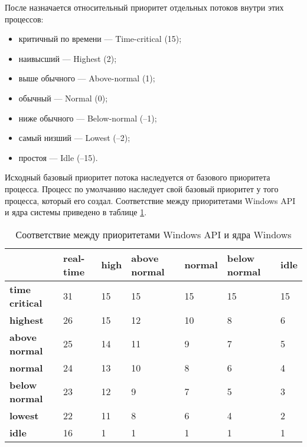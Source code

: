 \documentclass[a4paper,14pt,russian]{extreport}
\begin{document}
	После назначается относительный приоритет отдельных потоков внутри этих процессов:
	\begin{itemize}
		\item критичный по времени — Time-critical (15);
		\item наивысший — Highest (2);
		\item выше обычного — Above-normal (1);
		\item обычный — Normal (0);
		\item ниже обычного — Below-normal (–1);
		\item самый низший — Lowest (–2);
		\item простоя — Idle (–15).
	\end{itemize}

	Исходный базовый приоритет потока наследуется от базового приоритета процесса.
	Процесс по умолчанию наследует свой базовый приоритет у того процесса, который его создал.
	Соответствие между приоритетами Windows API и ядра системы приведено в таблице \ref{tbl:priority}.
	
	\begin{table}[h]
		\caption{Соответствие между приоритетами Windows API и ядра Windows}
		\begin{center}
			\begin{tabular}{|l|p{45pt}|p{45pt}|p{45pt}|p{45pt}|p{45pt}|p{45pt}|}
				\hline
				{} & \textbf{real-time} & \textbf{high} & \textbf{above normal} & \textbf{normal} & \textbf{below normal} & \textbf{idle}\\
				\hline
				\textbf{time critical} & 31 & 15 & 15 & 15 & 15 & 15 \\
				\hline
				\textbf{highest} & 26 & 15 & 12 & 10 & 8 & 6 \\
				\hline
				\textbf{above normal} & 25 & 14 & 11 & 9 & 7 & 5 \\
				\hline
				\textbf{normal} & 24 & 13 & 10 & 8 & 6 & 4 \\
				\hline
				\textbf{below normal} & 23 & 12 & 9 & 7 & 5 & 3 \\
				\hline
				\textbf{lowest} & 22 & 11 & 8 & 6 & 4 & 2 \\
				\hline
				\textbf{idle} & 16 & 1 & 1 & 1 & 1 & 1 \\
				\hline
			\end{tabular}
		\end{center}
		\label{tbl:priority}
	\end{table}
\end{document}

